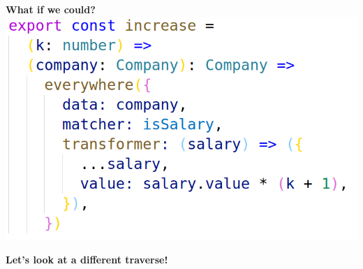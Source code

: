\documentclass[14pt]{beamer}
\begin{document}
\begin{frame}
  \centering\textbf{What if we could?}
  \vfill
  \includegraphics[height=0.8\textheight,width=\textwidth,keepaspectratio]{graphics/increase-ts.png}
\end{frame}

\begin{frame}
  \vfill
  \centering\textbf{Let's look at a different traverse!}
  \vfill
\end{frame}
\end{document}
